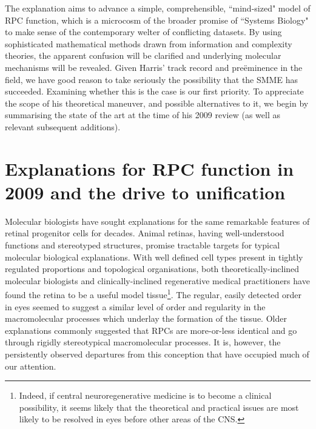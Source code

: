 \documentclass{ut-thesis}
\begin{document}
\begin{NoHyper}
The explanation aims to advance a simple, comprehensible, ``mind-sized" model of RPC function, which is a microcosm of the broader promise of ``Systems Biology" to make sense of the contemporary welter of conflicting datasets. By using sophisticated mathematical methods drawn from information and complexity theories, the apparent confusion will be clarified and underlying molecular mechanisms will be revealed. Given Harris' track record and pre\"{e}minence in the field, we have good reason to take seriously the possibility that the SMME has succeeded. Examining whether this is the case is our first priority. To appreciate the scope of his theoretical maneuver, and possible alternatives to it, we begin by summarising the state of the art at the time of his 2009 review (as well as relevant subsequent additions).

\section{Explanations for RPC function in 2009 and the drive to unification}
\label{sec:TheoryOptions}
Molecular biologists have sought explanations for the same remarkable features of retinal progenitor cells for decades. Animal retinas, having well-understood functions and stereotyped structures, promise tractable  targets for typical molecular biological explanations. With well defined cell types present in tightly regulated proportions and topological organisations, both theoretically-inclined molecular biologists and clinically-inclined regenerative medical practitioners have found the retina to be a useful model tissue\footnote{Indeed, if central neuroregenerative medicine is to become a clinical possibility, it seems likely that the theoretical and practical issues are most likely to be resolved in eyes before other areas of the CNS.}. The regular, easily detected order in eyes seemed to suggest a similar level of order and regularity in the macromolecular processes which underlay the formation of the tissue. Older explanations commonly suggested that RPCs are more-or-less identical and go through rigidly stereotypical macromolecular processes. It is, however, the persistently observed departures from this conception that have occupied much of our attention.


\end{NoHyper}
\end{document}
